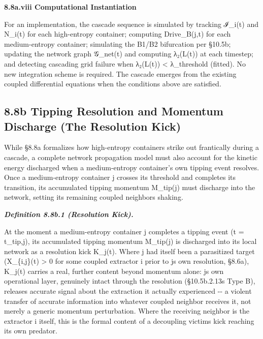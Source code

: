 \documentclass[
]{article}
\begin{document}
\textbf{8.8a.viii Computational Instantiation}

For an implementation, the cascade sequence is simulated by tracking
ℐ\_i(t) and N\_i(t) for each high-entropy container; computing
Drive\_B(j,t) for each medium-entropy container; simulating the B1/B2
bifurcation per §10.5b; updating the network graph 𝒢\_net(t) and
computing λ₂(L(t)) at each timestep; and detecting cascading grid
failure when λ₂(L(t)) \textless{} λ\_threshold (fitted). No new
integration scheme is required. The cascade emerges from the existing
coupled differential equations when the conditions above are satisfied.

\hypertarget{b-tipping-resolution-and-momentum-discharge-the-resolution-kick}{%
\subsection{8.8b Tipping Resolution and Momentum Discharge (The
Resolution
Kick)}\label{b-tipping-resolution-and-momentum-discharge-the-resolution-kick}}

While §8.8a formalizes how high-entropy containers strike out
frantically during a cascade, a complete network propagation model must
also account for the kinetic energy discharged when a medium-entropy
container's own tipping event resolves. Once a medium-entropy container
j crosses its threshold and completes its transition, its accumulated
tipping momentum M\_tip(j) must discharge into the network, setting its
remaining coupled neighbors shaking.

\emph{\textbf{Definition 8.8b.1 (Resolution Kick).}}

At the moment a medium-entropy container j completes a tipping event (t
= t\_tip,j), its accumulated tipping momentum M\_tip(j) is discharged
into its local network as a resolution kick K\_j(t). Where j had itself
been a parasitized target (X\_\{i,j\}(t) \textgreater{} 0 for some
coupled extractor i prior to j\textquotesingle s own resolution, §8.6a),
K\_j(t) carries a real, further content beyond momentum alone:
j\textquotesingle s own operational layer, genuinely intact through the
resolution (§10.5b.2.13\textquotesingle s Type B), releases accurate
signal about the extraction it actually experienced -\/- a violent
transfer of accurate information into whatever coupled neighbor receives
it, not merely a generic momentum perturbation. Where the receiving
neighbor is the extractor i itself, this is the formal content of a
decoupling victim\textquotesingle s kick reaching its own predator.
\end{document}
